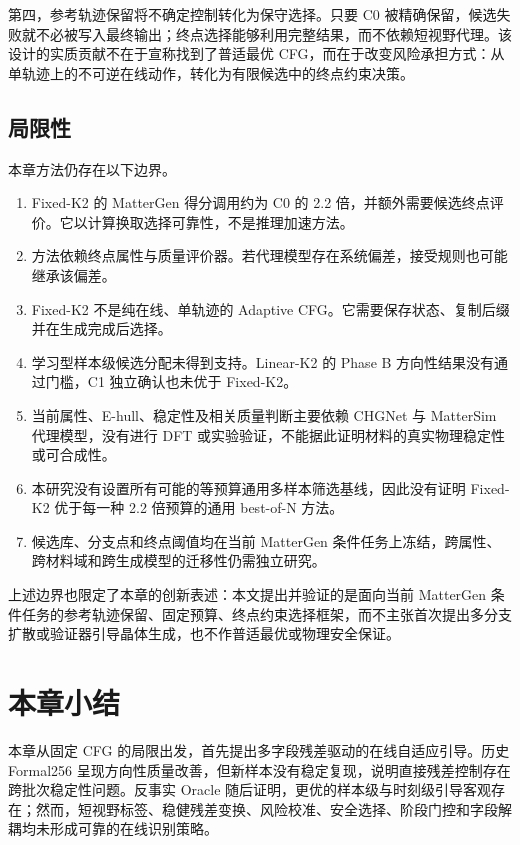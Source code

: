 第四，参考轨迹保留将不确定控制转化为保守选择。只要 C0 被精确保留，候选失败就不必被写入最终输出；终点选择能够利用完整结果，而不依赖短视野代理。该设计的实质贡献不在于宣称找到了普适最优 CFG，而在于改变风险承担方式：从单轨迹上的不可逆在线动作，转化为有限候选中的终点约束决策。

\subsection{局限性}

本章方法仍存在以下边界。

\begin{enumerate}
\def\labelenumi{\arabic{enumi}.}
\tightlist
\item
  Fixed-K2 的 MatterGen 得分调用约为 C0 的 2.2 倍，并额外需要候选终点评价。它以计算换取选择可靠性，不是推理加速方法。
\item
  方法依赖终点属性与质量评价器。若代理模型存在系统偏差，接受规则也可能继承该偏差。
\item
  Fixed-K2 不是纯在线、单轨迹的 Adaptive CFG。它需要保存状态、复制后缀并在生成完成后选择。
\item
  学习型样本级候选分配未得到支持。Linear-K2 的 Phase B 方向性结果没有通过门槛，C1 独立确认也未优于 Fixed-K2。
\item
  当前属性、E-hull、稳定性及相关质量判断主要依赖 CHGNet 与 Matter\allowbreak Sim 代理模型，没有进行 DFT 或实验验证，不能据此证明材料的真实物理稳定性或可合成性。
\item
  本研究没有设置所有可能的等预算通用多样本筛选基线，因此没有证明 Fixed-K2 优于每一种 2.2 倍预算的通用 best-of-N 方法。
\item
  候选库、分支点和终点阈值均在当前 MatterGen 条件任务上冻结，跨属性、跨材料域和跨生成模型的迁移性仍需独立研究。
\end{enumerate}

上述边界也限定了本章的创新表述：本文提出并验证的是面向当前 MatterGen 条件任务的参考轨迹保留、固定预算、终点约束选择框架，而不主张首次提出多分支扩散或验证器引导晶体生成，也不作普适最优或物理安全保证。

\section{本章小结}

本章从固定 CFG 的局限出发，首先提出多字段残差驱动的在线自适应引导。历史 Formal256 呈现方向性质量改善，但新样本没有稳定复现，说明直接残差控制存在跨批次稳定性问题。反事实 Oracle 随后证明，更优的样本级与时刻级引导客观存在；然而，短视野标签、稳健残差变换、风险校准、安全选择、阶段门控和字段解耦均未形成可靠的在线识别策略。

